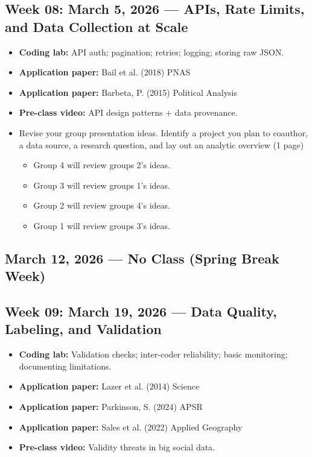 \documentclass[letterpaper,11pt]{article}
\newcommand{\compresslist}{
\setlength{\itemsep}{1pt}
\setlength{\parskip}{0pt}
\setlength{\parsep}{0pt}
}
\begin{document}
\subsection*{Week 08: March 5, 2026 --- APIs, Rate Limits, and Data Collection at Scale}
\begin{itemize}\compresslist
\item \textbf{Coding lab:} API auth; pagination; retries; logging; storing raw JSON.
\item \textbf{Application paper:} Bail et al. (2018) PNAS
\item \textbf{Application paper:} Barbeta, P. (2015) Political Analysis
\item \textbf{Pre-class video:} API design patterns + data provenance.
\item Revise your group presentation ideas. Identify a project you plan to coauthor, a data source, a research question, and lay out an analytic overview (1 page)
\begin{itemize}
\item Group 4 will review groups 2's ideas.
\item Group 3 will review groups 1's ideas.
\item Group 2 will review groups 4's ideas.
\item Group 1 will review groups 3's ideas.
\end{itemize}
\end{itemize}


\subsection*{March 12, 2026 --- No Class (Spring Break Week)} 

\subsection*{Week 09: March 19, 2026 --- Data Quality, Labeling, and Validation}
\begin{itemize}\compresslist
\item \textbf{Coding lab:} Validation checks; inter-coder reliability; basic monitoring; documenting limitations.
\item \textbf{Application paper:} Lazer et al. (2014) Science
\item \textbf{Application paper:} Parkinson, S. (2024) APSR
\item \textbf{Application paper:} Sales et al. (2022) Applied Geography
\item \textbf{Pre-class video:} Validity threats in big social data.
\end{itemize}
\end{document}

